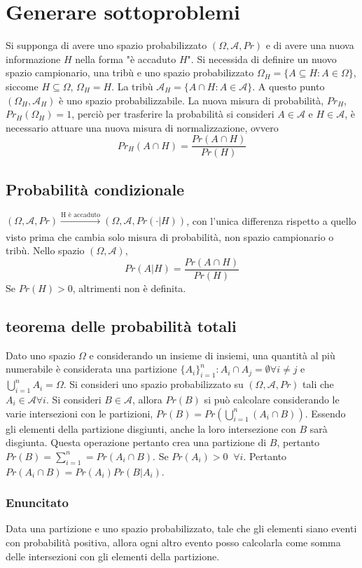 \chapter{Generare sottoproblemi}
Si supponga di avere uno spazio probabilizzato $(\Omega,\mathcal{A},Pr)$ e di avere una nuova informazione $H$ nella forma "\`e accaduto $H$". Si necessida di definire un nuovo 
spazio campionario, una trib\`u e uno spazio probabilizzato $\Omega_H=\{A\subseteq H:A\in\Omega\}$, siccome $H\subseteq\Omega$, $\Omega_H=H$. La trib\`u $\mathcal{A}_H=\{A\cap H:A
\in\mathcal{A}\}$. A questo punto $(\Omega_H,\mathcal{A}_H)$ \`e uno spazio probabilizzabile. La nuova misura di probabilit\`a, $Pr_H$, $Pr_H(\Omega_H)=1$, perci\`o per 
trasferire la probabilit\`a si consideri $A\in\mathcal{A}$ e $H\in\mathcal{A}$, \`e necessario attuare una nuova misura di normalizzazione, ovvero 
\begin{equation}
Pr_H(A\cap H)=\dfrac{Pr(A\cap H)}{Pr(H)}
\end{equation}
\section{Probabilit\`a condizionale}
$(\Omega,\mathcal{A},Pr)\xrightarrow[]{\text{H \`e accaduto}}(\Omega,\mathcal{A},Pr(\cdot|H))$, con l'unica differenza rispetto a quello visto prima che cambia solo misura di 
probabilit\`a, non spazio campionario o trib\`u. Nello spazio $(\Omega,\mathcal{A})$, 
\begin{equation}
Pr(A|H)=\dfrac{Pr(A\cap H)}{Pr(H)}
\end{equation}
Se $Pr(H)>0$, altrimenti non \`e definita.  
\section{teorema delle probabilit\`a totali}
Dato uno spazio $\Omega$ e considerando un insieme di insiemi, una quantit\`a al pi\`u numerabile \`e considerata una partizione $\{A_i\}_{i=1}^n: A_i\cap A_j=\emptyset\forall i
\neq j$ e $\bigcup\limits_{i=1}^nA_i=\Omega$. Si consideri uno spazio probabilizzato su $(\Omega,\mathcal{A}, Pr)$ tali che $A_i\in\mathcal{A}\forall i$. Si consideri $B\in
\mathcal{A}$, allora $Pr(B)$ si pu\`o calcolare considerando le varie intersezioni con le partizioni, $Pr(B)=Pr(\bigcup\limits_{i=1}^n(A_i\cap B))$. Essendo gli elementi della
partizione disgiunti, anche la loro intersezione con $B$ sar\`a disgiunta. Questa operazione pertanto crea una partizione di $B$, pertanto $Pr(B)=\sum\limits_{i=1}^n=Pr(A_i\cap 
B)$.  Se $Pr(A_i)>0\;\;\forall i$. Pertanto $Pr(A_i\cap B)=Pr(A_i)Pr(B|A_i)$.
\subsection{Enuncitato}
Data una partizione e uno spazio probabilizzato, tale che gli elementi siano eventi con probabilit\`a positiva, allora ogni altro evento posso calcolarla come somma delle
intersezioni con gli elementi della partizione.